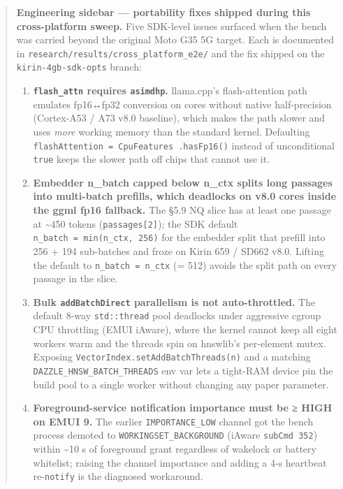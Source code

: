 \begin{quote}
\textbf{Engineering sidebar --- portability fixes shipped during this
cross-platform sweep.} Five SDK-level issues surfaced when the bench was carried
beyond the original Moto G35 5G target. Each is documented in
\texttt{research/results/cross\_platform\_e2e/} and the fix shipped on the
\texttt{kirin-4gb-sdk-opts} branch:

\begin{enumerate}
\def\labelenumi{\arabic{enumi}.}
\tightlist
\item
  \textbf{\texttt{flash\_attn} requires \texttt{asimdhp}.} llama.cpp's
  flash-attention path emulates fp16↔fp32 conversion on cores without native
  half-precision (Cortex-A53 / A73 v8.0 baseline), which makes the path slower
  and uses \emph{more} working memory than the standard kernel. Defaulting
  \texttt{flashAttention\ =\ CpuFeatures\ .hasFp16()} instead of unconditional
  \texttt{true} keeps the slower path off chips that cannot use it.
\item
  \textbf{Embedder n\_batch capped below n\_ctx splits long passages into
  multi-batch prefills, which deadlocks on v8.0 cores inside the ggml fp16
  fallback.} The §5.9 NQ slice has at least one passage at \textasciitilde450
  tokens (\texttt{passages{[}2{]}}); the SDK default
  \texttt{n\_batch\ =\ min(n\_ctx,\ 256)} for the embedder split that prefill
  into 256 + 194 sub-batches and froze on Kirin 659 / SD662 v8.0. Lifting the
  default to \texttt{n\_batch\ =\ n\_ctx} (= 512) avoids the split path on every
  passage in the slice.
\item
  \textbf{Bulk \texttt{addBatchDirect} parallelism is not auto-throttled.} The
  default 8-way \texttt{std::thread} pool deadlocks under aggressive cgroup CPU
  throttling (EMUI iAware), where the kernel cannot keep all eight workers warm
  and the threads spin on hnswlib's per-element mutex. Exposing
  \texttt{VectorIndex.setAddBatchThreads(n)} and a matching
  \texttt{DAZZLE\_HNSW\_BATCH\_THREADS} env var lets a tight-RAM device pin the
  build pool to a single worker without changing any paper parameter.
\item
  \textbf{Foreground-service notification importance must be ≥ HIGH on EMUI 9.}
  The earlier \texttt{IMPORTANCE\_LOW} channel got the bench process demoted to
  \texttt{WORKINGSET\_BACKGROUND} (iAware \texttt{subCmd\ 352}) within
  \textasciitilde10 s of foreground grant regardless of wakelock or battery
  whitelist; raising the channel importance and adding a 4-s heartbeat
  re-\texttt{notify} is the diagnosed workaround.

\end{enumerate}
\end{quote}
